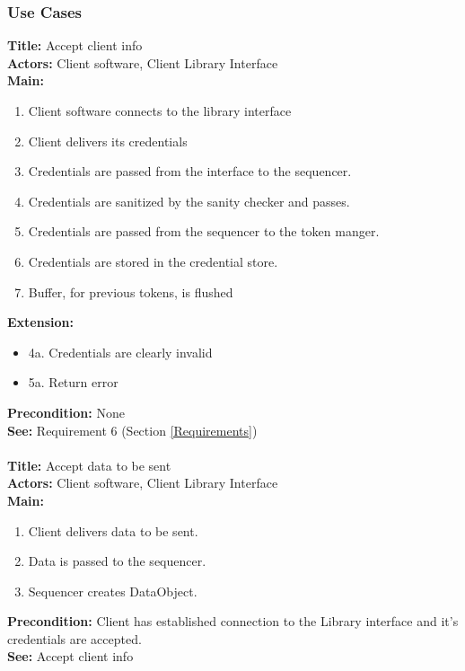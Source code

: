 	\subsubsection{Use Cases}\label{client use cases}
		\textbf{Title:} Accept client info \\
		\textbf{Actors:} Client software, Client Library Interface \\
		\textbf{Main:}
		\begin{enumerate}
			\item Client software connects to the library interface
			\item Client delivers its credentials
			\item Credentials are passed from the interface to the sequencer.
			\item Credentials are sanitized by the sanity checker and passes.
			\item Credentials are passed from the sequencer to the token manger.
			\item Credentials are stored in the credential store.
			\item Buffer, for previous tokens, is flushed
		\end{enumerate}
		\textbf{Extension:} 
		\begin{itemize}
			  \item[] 4a. Credentials are clearly invalid
			  \item[] 5a. Return error
		\end{itemize}
		\textbf{Precondition:}  None\\
		\textbf{See:} Requirement 6 (Section \ref{Requirements})
		\\\\
		\textbf{Title:} Accept data to be sent \\
		\textbf{Actors:} Client software, Client Library Interface \\
		\textbf{Main:}
		\begin{enumerate}
			\item Client delivers data to be sent.
			\item Data is passed to the sequencer.
			\item Sequencer creates DataObject.
		\end{enumerate}
		\textbf{Precondition:} Client has established connection to the Library interface and it's credentials are accepted. \\
		\textbf{See:} Accept client info
		\\\\

